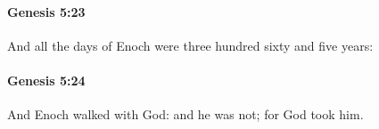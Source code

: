 		\paragraph{Genesis 5:23} %
			\label{GENESIS-5-23}

			And all the days of Enoch were three hundred sixty and five years:


		\paragraph{Genesis 5:24} %
			\label{GENESIS-5-24}

			And Enoch walked with God: and he was not; for God took him.


